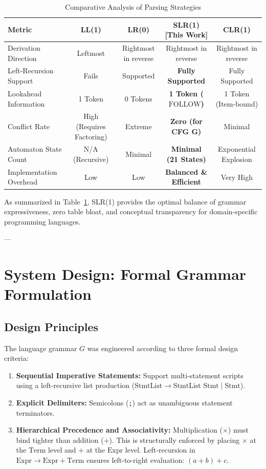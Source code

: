 \documentclass[11pt,a4paper]{article}
\begin{document}
\begin{table}[h]
\centering
\small
\caption{Comparative Analysis of Parsing Strategies}
\label{tab:lit_survey}
\begin{tabular}{lcccc}
\toprule
\textbf{Metric} & \textbf{LL(1)} & \textbf{LR(0)} & \textbf{SLR(1) [This Work]} & \textbf{CLR(1)} \\
\midrule
Derivation Direction & Leftmost & Rightmost in reverse & Rightmost in reverse & Rightmost in reverse \\
Left-Recursion Support & Fails & Supported & \textbf{Fully Supported} & Fully Supported \\
Lookahead Information & 1 Token & 0 Tokens & \textbf{1 Token ($\text{FOLLOW}$)} & 1 Token (Item-bound) \\
Conflict Rate & High (Requires Factoring) & Extreme & \textbf{Zero (for CFG G)} & Minimal \\
Automaton State Count & N/A (Recursive) & Minimal & \textbf{Minimal (21 States)} & Exponential Explosion \\
Implementation Overhead & Low & Low & \textbf{Balanced \& Efficient} & Very High \\
\bottomrule
\end{tabular}
\end{table}

As summarized in Table~\ref{tab:lit_survey}, SLR(1) provides the optimal balance of grammar expressiveness, zero table bloat, and conceptual transparency for domain-specific programming languages.

---

\section{System Design: Formal Grammar Formulation}

\subsection{Design Principles}
The language grammar $G$ was engineered according to three formal design criteria:
\begin{enumerate}
    \item \textbf{Sequential Imperative Statements:} Support multi-statement scripts using a left-recursive list production ($\text{StmtList} \to \text{StmtList } \text{Stmt} \mid \text{Stmt}$).
    \item \textbf{Explicit Delimiters:} Semicolons (\texttt{;}) act as unambiguous statement terminators.
    \item \textbf{Hierarchical Precedence and Associativity:} Multiplication ($\times$) must bind tighter than addition ($+$). This is structurally enforced by placing $\times$ at the $\text{Term}$ level and $+$ at the $\text{Expr}$ level. Left-recursion in $\text{Expr} \to \text{Expr} + \text{Term}$ ensures left-to-right evaluation: $(a + b) + c$.
\end{enumerate}
\end{document}
